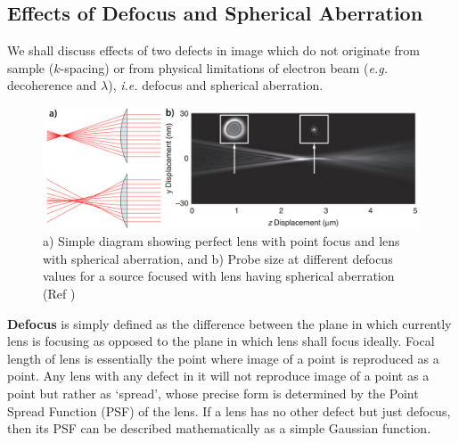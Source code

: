 \subsection{Effects of Defocus and Spherical Aberration}
We shall discuss effects of two defects in image which do not originate from sample ($k$-spacing) or from physical limitations of electron beam (\textit{e.g.} decoherence and $\lambda$), \textit{i.e.} defocus and spherical aberration.

\begin{figure}
    \centering
    \includegraphics[width=\textwidth]{figures/circleleastconf.pdf}
    \caption{a) Simple diagram showing perfect lens with point focus and lens with spherical aberration, and b) Probe size at different defocus values for a source focused with lens having spherical aberration (Ref \cite{Humphry2012})}
    \label{fig:leastconfusion}
\end{figure}

\textbf{Defocus} is simply defined as the difference between the plane in which currently lens is focusing as opposed to the plane in which lens shall focus ideally.
Focal length of lens is essentially the point where image of a point is reproduced as a point.
Any lens with any defect in it will not reproduce image of a point as a point but rather as `spread', whose precise form is determined by the Point Spread Function (PSF) of the lens.
If a lens has no other defect but just defocus, then its PSF can be described mathematically as a simple Gaussian function.


